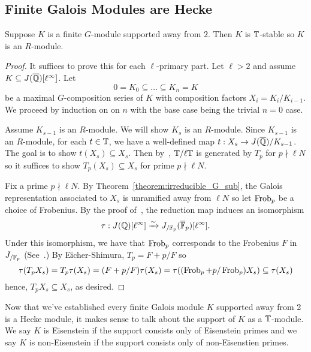 \documentclass{article}
\begin{document}
\subsection{Finite Galois Modules are Hecke}

\begin{theorem}\label{theorem:G_modules_are_Hecke}
    Suppose $K$ is a finite $G$-module supported away from $2$. Then $K$ is
    $\mathbb{T}$-stable so $K$ is an $R$-module.
\end{theorem}
\begin{proof}
    It suffices to prove this for each $\ell$-primary part. Let $\ell>2$ and
    assume $K\subseteq J(\overline{\mathbb{Q}})[\ell^\infty]$. Let
    \[
        0 = K_0 \subseteq \ldots \subseteq K_n = K
    \]
    be a maximal $G$-composition series of $K$ with composition factors $X_i =
    K_i/K_{i-1}$. We proceed by induction on on $n$ with the base
    case being the trivial $n=0$ case. 
    
    Assume $K_{s-1}$ is an $R$-module. We will show $K_s$ is an $R$-module.
    Since $K_{s-1}$ is an $R$-module, for each $t\in \mathbb{T}$, we have a
    well-defined map $t:X_s\to J(\overline{\mathbb{Q}})/K_{s-1}$. The goal is to show
    $t(X_s)\subseteq X_s$. Then by~\cite[Prop. 6.1]{MR1610883}, $\mathbb{T}/\ell \mathbb{T}$
    is generated by $T_p$ for $p\nmid \ell N$ so it suffices to show
    $T_p(X_s)\subseteq X_s$ for prime $p\nmid \ell N$.

    Fix a prime $p\nmid \ell N$. By Theorem~\ref{theorem:irreducible_G_sub},
    the Galois representation associated to $X_s$ is unramified away from $\ell
    N$ so let $\operatorname{Frob}_p$ be a choice of Frobenius. By the proof of~\cite[Lemma
    12.6.2]{ribet-stein:mod}, the reduction map induces an isomorphism
    \[
        \tau:J(\mathbb{Q})[\ell^\infty] \xrightarrow{\sim} J_{/\mathbb{F}_p} (\overline{\mathbb{F}}_p)[\ell^\infty].
    \]
    Under this isomorphism, we have that $\operatorname{Frob}_p$ corresponds to the Frobenius
    $F$ in $J_{/\mathbb{F}_p}$ (See~\cite[\S 5.3]{ribet-stein:serre}.) By
    Eicher-Shimura, $T_p = F+p/F$ so
    \[
    \tau(T_p X_s) 
    = T_p\tau(X_s) 
    = (F+p/F)\tau(X_s)
    = \tau((\operatorname{Frob}_p+p/\operatorname{Frob}_p)X_s)
    \subseteq \tau(X_s)
    \]
    hence, $T_p X_s\subseteq X_s$, as desired.
\end{proof}

Now that we've established every finite Galois module $K$ supported away from 2
is a Hecke module, it makes sense to talk about the support of $K$ as a
$\mathbb{T}$-module. We say $K$ is Eisenstein if the support consists only of
Eisenstein primes and we say $K$ is non-Eisenstein if the support consists
only of non-Eisenstien primes.
\end{document}
